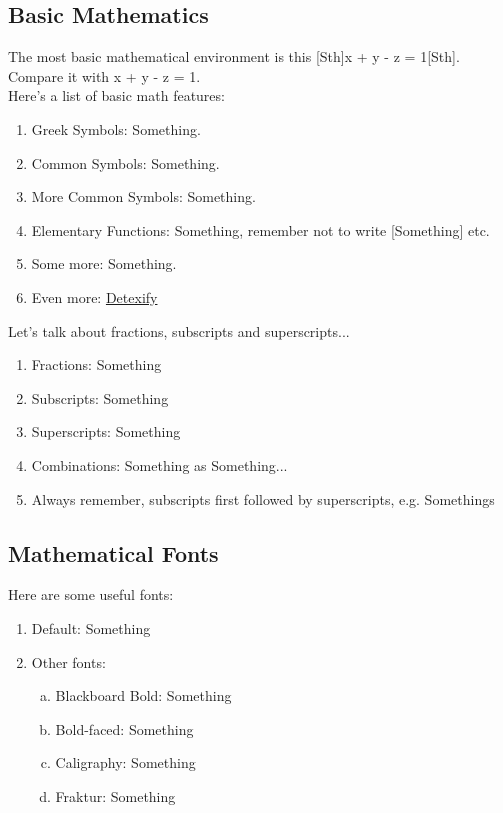 \documentclass{article}
\begin{document}
		\subsection{Basic Mathematics}
			The most basic mathematical environment is this [Sth]x + y - z = 1[Sth].\\
			Compare it with x + y - z = 1.\\
			Here's a list of basic math features:
			\begin{enumerate}
				\item Greek Symbols: Something.
				\item Common Symbols: Something.
				\item More Common Symbols: Something.
				\item Elementary Functions: Something, remember not to write [Something] etc.
				\item Some more: Something.
				\item Even more: \href{http://detexify.kirelabs.org/classify.html}{Detexify} %
			\end{enumerate}
			Let's talk about fractions, subscripts and superscripts...
			\begin{enumerate}
				\item Fractions: Something
				\item Subscripts: Something
				\item Superscripts: Something
				\item Combinations: Something as Something... 				\item Always remember, subscripts first followed by superscripts, e.g. Somethings
			\end{enumerate}
		\subsection{Mathematical Fonts}
			Here are some useful fonts:
			\begin{enumerate}
				\item Default: Something
				\item Other fonts:
				\begin{enumerate}[(a)]
					\item Blackboard Bold: Something
					\item Bold-faced: Something
					\item Caligraphy: Something
					\item Fraktur: Something
				\end{enumerate}
			\end{enumerate}
\end{document}
